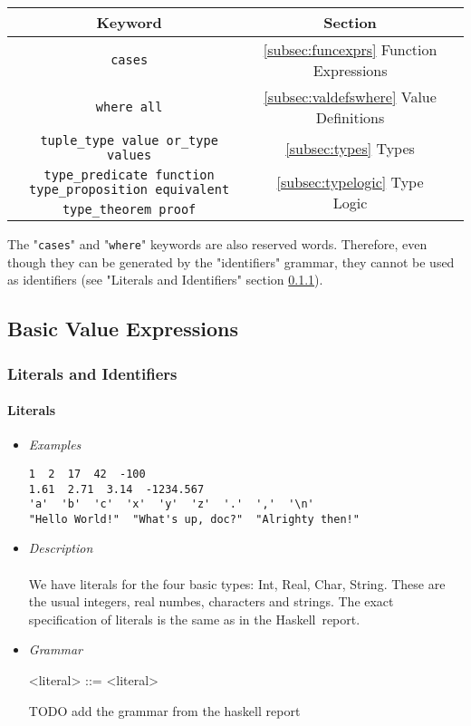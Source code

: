 \documentclass{article}
\def\H{Haskell}
\begin{document}
\begin{center}
\begin{tabular}{ |c|c|c| } 
\hline
Keyword & Section \\ 
\hline
\hline
\texttt{cases} & \ref{subsec:funcexprs} Function Expressions \\
\hline
\texttt{where all} & \ref{subsec:valdefswhere} Value Definitions \\
\hline
\texttt{tuple_type value or_type values} & \ref{subsec:types} Types \\
\hline
\texttt{type_predicate function type_proposition equivalent} &
  \multirow{2}{*}{\ref{subsec:typelogic} Type Logic} \\
\texttt{type_theorem proof} & \\
\hline
\end{tabular}
\end{center}
The "\texttt{cases}" and "\texttt{where}" keywords are also
reserved words. Therefore, even though they can be generated by the
"identifiers" grammar, they cannot be used as identifiers (see "Literals and
Identifiers" section \ref{subsubsec:litsandidents}).

\subsection{Basic Value Expressions}

\subsubsection{Literals and Identifiers}
\label{subsubsec:litsandidents}

\paragraph{Literals}
\begin{itemize}

\item \textit{Examples}
\begin{verbatim}
1  2  17  42  -100
1.61  2.71  3.14  -1234.567
'a'  'b'  'c'  'x'  'y'  'z'  '.'  ','  '\n'
"Hello World!"  "What's up, doc?"  "Alrighty then!"
\end{verbatim}

\item \textit{Description} \\\\
We have literals for the four basic types: Int, Real, Char, String. These are the 
usual integers, real numbes, characters and strings. The exact specification of 
literals is the same as in the \H\ report.

\item \textit{Grammar}
\begin{grammar}
<literal> ::= <literal>
\end{grammar}
TODO add the grammar from the haskell report

\end{itemize}
\end{document}
